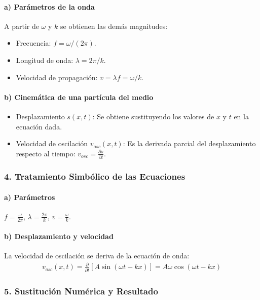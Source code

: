 \paragraph*{a) Parámetros de la onda}
A partir de $\omega$ y $k$ se obtienen las demás magnitudes:
\begin{itemize}
    \item Frecuencia: $f = \omega / (2\pi)$.
    \item Longitud de onda: $\lambda = 2\pi / k$.
    \item Velocidad de propagación: $v = \lambda f = \omega / k$.
\end{itemize}
\paragraph*{b) Cinemática de una partícula del medio}
\begin{itemize}
    \item Desplazamiento $s(x,t)$: Se obtiene sustituyendo los valores de $x$ y $t$ en la ecuación dada.
    \item Velocidad de oscilación $v_{osc}(x,t)$: Es la derivada parcial del desplazamiento respecto al tiempo: $v_{osc} = \frac{\partial s}{\partial t}$.
\end{itemize}

\subsubsection*{4. Tratamiento Simbólico de las Ecuaciones}
\paragraph*{a) Parámetros}
$f = \frac{\omega}{2\pi}$, $\lambda = \frac{2\pi}{k}$, $v = \frac{\omega}{k}$.
\paragraph*{b) Desplazamiento y velocidad}
La velocidad de oscilación se deriva de la ecuación de onda:
\begin{gather}
    v_{osc}(x,t) = \frac{\partial}{\partial t} [A\sin(\omega t - kx)] = A\omega\cos(\omega t - kx)
\end{gather}

\subsubsection*{5. Sustitución Numérica y Resultado}
